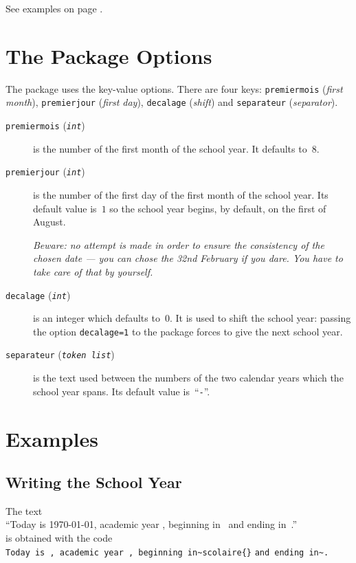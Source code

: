 \documentclass[full]{l3doc}
\newcommand\BOP{\discretionary{}{}{}}
\begin{document}
See examples on page \pageref{sec:changelook}.


\section{The Package Options}
\label{sec:keys}

The package uses the key-value options. There are four keys:
\texttt{premiermois} (\emph{first month}), \texttt{premierjour} (\emph{first
  day}), \texttt{decalage} (\emph{shift}) and \texttt{separateur}
(\emph{separator}).

\begin{description}
\item[\texttt{premiermois} (\textit{\texttt{int}})] is the number of the first
  month of the school year. It defaults to~\(8\).

\item[\texttt{premierjour} (\textit{\texttt{int}})] is the number of the first
  day of the first month of the school year. Its default value is~\(1\) so the
  school year begins, by default, on the first of August.

  \emph{Beware: no attempt is made in order to ensure the consistency of the
    chosen date --- you can chose the 32nd February if you dare. You have to
    take care of that by yourself.}

\item[\texttt{decalage} (\textit{\texttt{int}})] is an integer which defaults
  to~\(0\). It is used to shift the school year: passing the option
  \verb|decalage=1| to the package forces  to give the next
  school year.

\item[\texttt{separateur} (\textit{\texttt{token list}})] is the text used
  between the numbers of the two calendar years which the school year spans. Its
  default value is~\enquote{\texttt{-}}.
\end{description}


\section{Examples}
\label{sec:examples}

\subsection{Writing the School Year}
\label{sec:writingyear}

The text\\[0.5\baselineskip]
\enquote{Today is \today, academic year \anneescolaire, beginning
  in~\debutanneescolaire{} and ending in~\finanneescolaire.}\\[0.5\baselineskip]
is obtained with the code\\[0.5\baselineskip]
\texttt{Today is , academic year , beginning
  in}\verb|~|\BOP \texttt{sco}\BOP \texttt{laire}\verb|{}|
\texttt{and ending in\verb|~|.}
\end{document}
